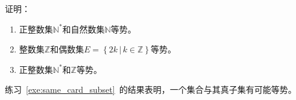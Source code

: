 \begin{exercise}\label{exe:same_card_subset}
    证明：
    \begin{enumerate}
        \item 正整数集$\mathbb{N}^\ast$和自然数集$\mathbb{N}$等势。

        \item 整数集$\mathbb{Z}$和偶数集$E = \left\{ 2k\,|\,k\in \mathbb{Z} \right\}
            $等势。

        \item 正整数集$\mathbb{N}^\ast$和$\mathbb{Z}$等势。
    \end{enumerate}
\end{exercise}

练习~\ref{exe:same_card_subset}~的结果表明，一个集合与其真子集有可能等势。
